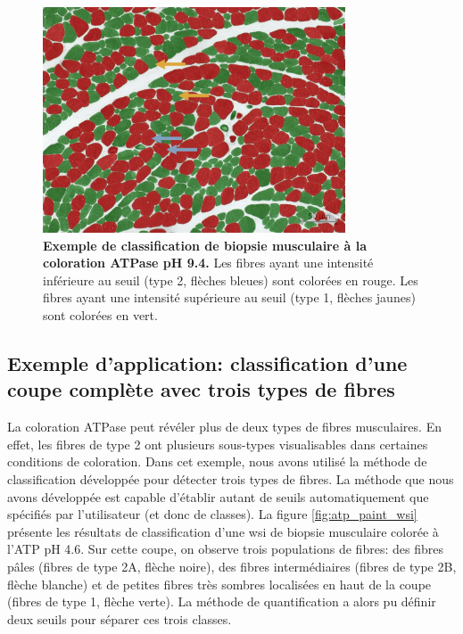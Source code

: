 \begin{figure}[htbp]
 \centering
 \includegraphics[width=0.8\textwidth]{figures/atp_paint.png}
 \caption[Exemple de classification de biopsie musculaire à la coloration ATPase pH 9.4]{\textbf{Exemple de classification de biopsie musculaire à la coloration ATPase pH 9.4.} Les fibres ayant une intensité inférieure au seuil (type 2, flèches bleues) sont colorées en rouge. Les fibres ayant une intensité supérieure au seuil (type 1, flèches jaunes) sont colorées en vert.}
 \label{fig:apt_paint}
\end{figure}

\subsection{Exemple d'application: classification d'une coupe complète avec trois types de fibres}
La coloration ATPase peut révéler plus de deux types de fibres musculaires. En effet, les fibres de type 2 ont plusieurs sous-types visualisables dans certaines conditions de coloration. Dans cet exemple, nous avons utilisé la méthode de classification développée pour détecter trois types de fibres. La méthode que nous avons développée est capable d'établir autant de seuils automatiquement que spécifiés par l'utilisateur (et donc de classes). La figure \ref{fig:atp_paint_wsi} présente les résultats de classification d'une \gls{wsi} de biopsie musculaire colorée à l'ATP pH 4.6. Sur cette coupe, on observe trois populations de fibres: des fibres pâles (fibres de type 2A, flèche noire), des fibres intermédiaires (fibres de type 2B, flèche blanche) et de petites fibres très sombres localisées en haut de la coupe (fibres de type 1, flèche verte). La méthode de quantification a alors pu définir deux seuils pour séparer ces trois classes. 

